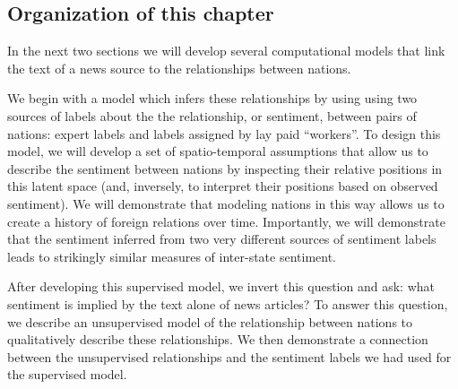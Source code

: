 

\subsection*{Organization of this chapter}

In the next two sections we will develop several computational models that
link the text of a news source to the relationships between nations.

We begin with a model which infers these relationships by using using
two sources of labels about the the relationship, or sentiment,
between pairs of nations: expert labels and labels assigned by lay
paid ``workers''.  To design this model, we will develop a set of
spatio-temporal assumptions that allow us to describe the sentiment
between nations by inspecting their relative positions in this
latent space (and, inversely, to interpret their positions based on
observed sentiment).  We will demonstrate that modeling nations in
this way allows us to create a history of foreign relations over time.
Importantly, we will demonstrate that the sentiment inferred from two
very different sources of sentiment labels leads to strikingly similar
measures of inter-state sentiment.

After developing this supervised model, we invert this question and
ask: what sentiment is implied by the text alone of news articles?  To
answer this question, we describe an unsupervised model of the
relationship between nations to qualitatively describe these
relationships.  We then demonstrate a connection between the
unsupervised relationships and the sentiment labels we had used for
the supervised model.
